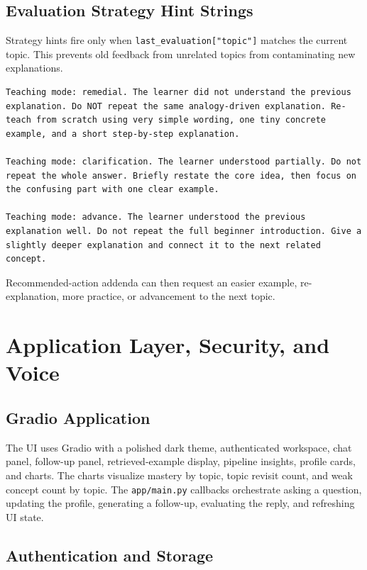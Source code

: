 \documentclass[11pt,a4paper]{article}
\begin{document}
\subsection{Evaluation Strategy Hint Strings}

Strategy hints fire only when \texttt{last\_evaluation["topic"]} matches the current topic. This prevents old feedback from unrelated topics from contaminating new explanations.

\begin{lstlisting}
Teaching mode: remedial. The learner did not understand the previous explanation. Do NOT repeat the same analogy-driven explanation. Re-teach from scratch using very simple wording, one tiny concrete example, and a short step-by-step explanation.

Teaching mode: clarification. The learner understood partially. Do not repeat the whole answer. Briefly restate the core idea, then focus on the confusing part with one clear example.

Teaching mode: advance. The learner understood the previous explanation well. Do not repeat the full beginner introduction. Give a slightly deeper explanation and connect it to the next related concept.
\end{lstlisting}

Recommended-action addenda can then request an easier example, re-explanation, more practice, or advancement to the next topic.

\section{Application Layer, Security, and Voice}

\subsection{Gradio Application}

The UI uses Gradio with a polished dark theme, authenticated workspace, chat panel, follow-up panel, retrieved-example display, pipeline insights, profile cards, and charts. The charts visualize mastery by topic, topic revisit count, and weak concept count by topic. The \texttt{app/main.py} callbacks orchestrate asking a question, updating the profile, generating a follow-up, evaluating the reply, and refreshing UI state.

\subsection{Authentication and Storage}
\end{document}
